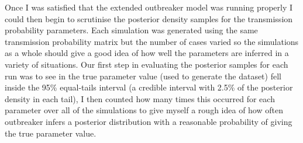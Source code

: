 \documentclass[11pt,a4paper]{report}
\begin{document}
Once I was satisfied that the extended outbreaker model was running properly I could then begin to scrutinise the posterior density samples for the transmission probability parameters. Each simulation was generated using the same transmission probability matrix but the number of cases varied so the simulations as a whole should give a good idea of how well the parameters are inferred in a variety of situations. Our first step in evaluating the posterior samples for each run was to see in the true parameter value (used to generate the dataset) fell inside the 95\% equal-tails interval (a credible interval with 2.5\% of the posterior density in each tail), I then counted how many times this occurred for each parameter over all of the simulations to give myself a rough idea of how often outbreaker infers a posterior distribution with a reasonable probability of giving the true parameter value.
\end{document}
